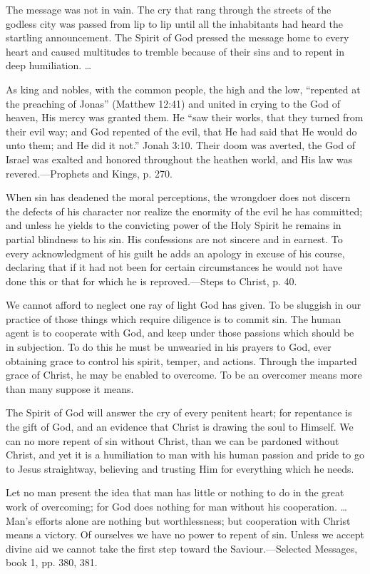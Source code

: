\documentclass[a4paper, 10pt, twoside, headings=small]{scrartcl}
\begin{document}
\begin{multicols}{2}
The message was not in vain. The cry that rang through the streets of the godless city was passed from lip to lip until all the inhabitants had heard the startling announcement. The Spirit of God pressed the message home to every heart and caused multitudes to tremble because of their sins and to repent in deep humiliation. …

As king and nobles, with the common people, the high and the low, “repented at the preaching of Jonas” (Matthew 12:41) and united in crying to the God of heaven, His mercy was granted them. He “saw their works, that they turned from their evil way; and God repented of the evil, that He had said that He would do unto them; and He did it not.” Jonah 3:10. Their doom was averted, the God of Israel was exalted and honored throughout the heathen world, and His law was revered.—Prophets and Kings, p. 270.

When sin has deadened the moral perceptions, the wrongdoer does not discern the defects of his character nor realize the enormity of the evil he has committed; and unless he yields to the convicting power of the Holy Spirit he remains in partial blindness to his sin. His confessions are not sincere and in earnest. To every acknowledgment of his guilt he adds an apology in excuse of his course, declaring that if it had not been for certain circumstances he would not have done this or that for which he is reproved.—Steps to Christ, p. 40.

We cannot afford to neglect one ray of light God has given. To be sluggish in our practice of those things which require diligence is to commit sin. The human agent is to cooperate with God, and keep under those passions which should be in subjection. To do this he must be unwearied in his prayers to God, ever obtaining grace to control his spirit, temper, and actions. Through the imparted grace of Christ, he may be enabled to overcome. To be an overcomer means more than many suppose it means.

The Spirit of God will answer the cry of every penitent heart; for repentance is the gift of God, and an evidence that Christ is drawing the soul to Himself. We can no more repent of sin without Christ, than we can be pardoned without Christ, and yet it is a humiliation to man with his human passion and pride to go to Jesus straightway, believing and trusting Him for everything which he needs.

Let no man present the idea that man has little or nothing to do in the great work of overcoming; for God does nothing for man without his cooperation. … Man’s efforts alone are nothing but worthlessness; but cooperation with Christ means a victory. Of ourselves we have no power to repent of sin. Unless we accept divine aid we cannot take the first step toward the Saviour.—Selected Messages, book 1, pp. 380, 381.


\end{multicols}
\end{document}
